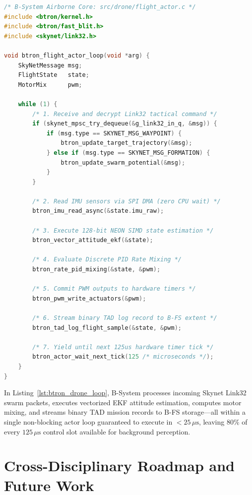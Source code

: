 \documentclass[10pt,journal,compsoc,twocolumn]{article}
\begin{document}
\begin{lstlisting}[language=C, caption={B-System flight control actor with Link32 ingestion.}, label={lst:btron_drone_loop}]
/* B-System Airborne Core: src/drone/flight_actor.c */
#include <btron/kernel.h>
#include <btron/fast_blit.h>
#include <skynet/link32.h>

void btron_flight_actor_loop(void *arg) {
    SkyNetMessage msg;
    FlightState   state;
    MotorMix      pwm;

    while (1) {
        /* 1. Receive and decrypt Link32 tactical command */
        if (skynet_mpsc_try_dequeue(&g_link32_in_q, &msg)) {
            if (msg.type == SKYNET_MSG_WAYPOINT) {
                btron_update_target_trajectory(&msg);
            } else if (msg.type == SKYNET_MSG_FORMATION) {
                btron_update_swarm_potential(&msg);
            }
        }

        /* 2. Read IMU sensors via SPI DMA (zero CPU wait) */
        btron_imu_read_async(&state.imu_raw);

        /* 3. Execute 128-bit NEON SIMD state estimation */
        btron_vector_attitude_ekf(&state);

        /* 4. Evaluate Discrete PID Rate Mixing */
        btron_rate_pid_mixing(&state, &pwm);

        /* 5. Commit PWM outputs to hardware timers */
        btron_pwm_write_actuators(&pwm);

        /* 6. Stream binary TAD log record to B-FS extent */
        btron_tad_log_flight_sample(&state, &pwm);

        /* 7. Yield until next 125us hardware timer tick */
        btron_actor_wait_next_tick(125 /* microseconds */);
    }
}
\end{lstlisting}

In Listing~\ref{lst:btron_drone_loop}, B-System processes incoming Skynet Link32 swarm packets, executes vectorized EKF attitude estimation, computes motor mixing, and streams binary TAD mission records to B-FS storage—all within a single non-blocking actor loop guaranteed to execute in $<25\,\mu\text{s}$, leaving $80\%$ of every $125\,\mu\text{s}$ control slot available for background perception.

\section{Cross-Disciplinary Roadmap and Future Work}
\label{sec:roadmap}
\end{document}
